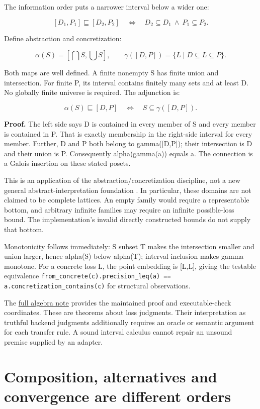 \documentclass[11pt]{article}
\begin{document}
The information order puts a narrower interval below a wider one:

\[
[D_1,P_1]\sqsubseteq[D_2,P_2]\quad\Longleftrightarrow\quad D_2\subseteq D_1\ \land\ P_1\subseteq P_2.
\]

Define abstraction and concretization:

\[
\alpha(S)=[\bigcap S,\bigcup S],\qquad
\gamma([D,P])=\{L\mid D\subseteq L\subseteq P\}.
\]

Both maps are well defined. A finite nonempty S has finite union and intersection. For finite P, its interval contains finitely many sets and at least D. No globally finite universe is required. The adjunction is:

\[
\alpha(S)\sqsubseteq[D,P]\quad\Longleftrightarrow\quad S\subseteq\gamma([D,P]).
\]

\textbf{Proof.} The left side says D is contained in every member of S and every member is contained in P. That is exactly membership in the right-side interval for every member. Further, D and P both belong to gamma([D,P]); their intersection is D and their union is P. Consequently alpha(gamma(a)) equals a. The connection is a Galois insertion on these stated posets.

This is an application of the abstraction/concretization discipline, not a new general abstract-interpretation foundation \cite{cousot1977}. In particular, these domains are not claimed to be complete lattices. An empty family would require a representable bottom, and arbitrary infinite families may require an infinite possible-loss bound. The implementation's invalid directly constructed bounds do not supply that bottom.

Monotonicity follows immediately: S subset T makes the intersection smaller and union larger, hence alpha(S) below alpha(T); interval inclusion makes gamma monotone. For a concrete loss L, the point embedding is [L,L], giving the testable equivalence \texttt{from\_concrete(c).precision\_leq(a) == a.concretization\_contains(c)} for structural observations.

The \href{../fidelity-domain.md}{full algebra note} provides the maintained proof and executable-check coordinates. These are theorems about loss judgments. Their interpretation as truthful backend judgments additionally requires an oracle or semantic argument for each transfer rule. A sound interval calculus cannot repair an unsound premise supplied by an adapter.

\clearpage

\section{Composition, alternatives and convergence are different orders}
\end{document}
